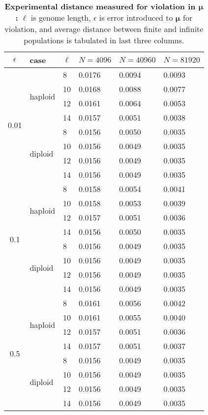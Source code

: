 \begin{table}[ht]
\caption{\textbf{Experimental distance measured for violation in $\bm{\mu}$:} $\ell$ is genome length, 
$\epsilon$ is error introduced to $\bm{\mu}$ for violation, and average distance between finite and 
infinite populations is tabulated in last three columns.}
\centering
\begin{tabularx}{0.75\textwidth}{ c *{5}{X}}
\toprule
$\epsilon$ & case & $\ell$ & $N = 4096$ & $N = 40960$ & $N = 81920$ \\
\midrule
\multirow{8}{*}{0.01} & \multirow{4}{*}{haploid} 	& 8 & 0.0176	& 0.0094	& 0.0093 \\
		      &   				& 10 & 0.0168	& 0.0088 	& 0.0077 \\ 
		      & 			 	& 12 & 0.0161	& 0.0064 	& 0.0053 \\
		      &  	 			& 14 & 0.0157	& 0.0051 	& 0.0038 \\ 
		      \cmidrule(l){2-6}
		      & \multirow{4}{*}{diploid} 	& 8 & 0.0156	&  0.0050	& 0.0035 \\
		      &  	 			& 10 & 0.0156	&  0.0049	& 0.0035 \\
		      & 			 	& 12 & 0.0156	&  0.0049	& 0.0035 \\
		      &  	 			& 14 & 0.0156	&  0.0049	& 0.0035 \\
		      \midrule
\multirow{8}{*}{0.1} & \multirow{4}{*}{haploid} 	& 8 & 0.0158	& 0.0054 	& 0.0041 \\
		      &   				& 10 & 0.0158	& 0.0053 	& 0.0039 \\	
		      & 				& 12 & 0.0157	& 0.0051 	& 0.0036 \\	
		      &  	 			& 14 & 0.0156	& 0.0050 	& 0.0035 \\
		      \cmidrule(l){2-6}
		      & \multirow{4}{*}{diploid} 	& 8 & 0.0156	&  0.0049	& 0.0035 \\
		      &  	 			& 10 & 0.0156	&  0.0049	& 0.0035 \\
		      & 				& 12 & 0.0156	&  0.0049	& 0.0035 \\
		      &  	 			& 14 & 0.0156	&  0.0049	& 0.0035 \\
		      \midrule
\multirow{8}{*}{0.5} & \multirow{4}{*}{haploid} 	& 8 & 0.0161	&  0.0056	& 0.0042 \\
		      &   				& 10 & 0.0161	&  0.0055	& 0.0040 \\
		      & 				& 12 & 0.0157	&  0.0051	& 0.0036 \\
		      &  	 			& 14 & 0.0157	&  0.0051	& 0.0037 \\
		      \cmidrule(l){2-6}
		      & \multirow{4}{*}{diploid} 	& 8 & 0.0156	&  0.0049	& 0.0035 \\	
		      &  	 			& 10 & 0.0156	&  0.0049 	& 0.0035 \\
		      &  				& 12 & 0.0156	&  0.0049	& 0.0035 \\
		      &  	 			& 14 & 0.0156	&  0.0049	& 0.0035 \\
\bottomrule
\end{tabularx}
\label{distanceMu}
\end{table}